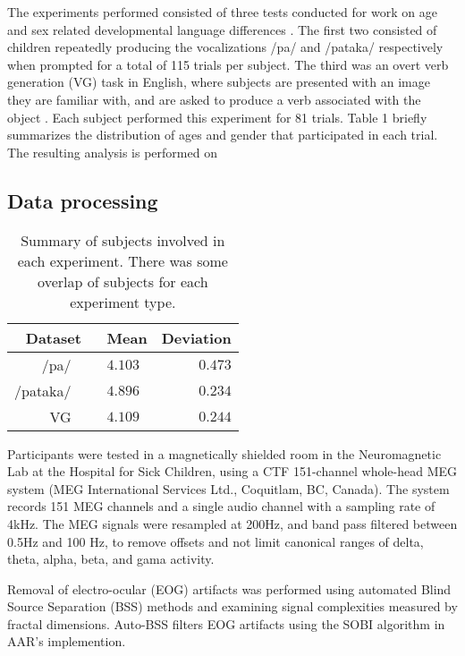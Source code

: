 \documentclass[a4paper]{article}
\begin{document}
The experiments performed consisted of three tests conducted for work on age and sex related developmental language differences \cite{Doesburg2016} \cite{Yu2014}. The first two consisted of children repeatedly producing the vocalizations /pa/ and /pataka/ respectively when prompted \cite{Yu2014} for a total of 115 trials per subject. The third was an overt verb generation (VG) task in English, where subjects are presented with an image they are familiar with, and are asked to produce a verb associated with the object \cite{Doesburg2016}. Each subject performed this experiment for 81 trials. Table 1 briefly summarizes the distribution of ages and gender that participated in each trial. The resulting analysis is performed on


\subsection{Data processing}
\begin{table}[t]
  \caption{Summary of subjects involved in each experiment. There was some overlap of subjects for each experiment type.}
  \label{tab:subjects}
  \centering
  \begin{tabular}{ r@{}l  r }
    \toprule
    \multicolumn{1}{c}{\textbf{Dataset}} & \multicolumn{1}{c}{\textbf{Mean}} & \multicolumn{1}{c}{\textbf{Deviation}} \\
    \midrule
    /pa/~~~                        & $4.103$         &     $0.473$       \\
    /pataka/~~~                          & $4.896$         &     $0.234$       \\
    VG~~~                       & $4.109$         &     $0.244$       \\
    \bottomrule
  \end{tabular}
\end{table}

Participants were tested in a magnetically shielded room in the Neuromagnetic Lab at the Hospital for Sick Children, using a CTF 151-channel whole-head MEG system (MEG International Services Ltd., Coquitlam, BC, Canada). The system records 151 MEG channels and a single audio channel with a sampling rate of 4kHz. The MEG signals were resampled at 200Hz, and band pass filtered between 0.5Hz and 100 Hz, to remove offsets and not limit canonical ranges of delta, theta, alpha, beta, and gama activity. %

Removal of electro-ocular (EOG) artifacts was performed using automated Blind Source Separation (BSS) methods and examining signal complexities measured by fractal dimensions. Auto-BSS filters EOG artifacts using the SOBI algorithm in AAR's implemention.
\end{document}
